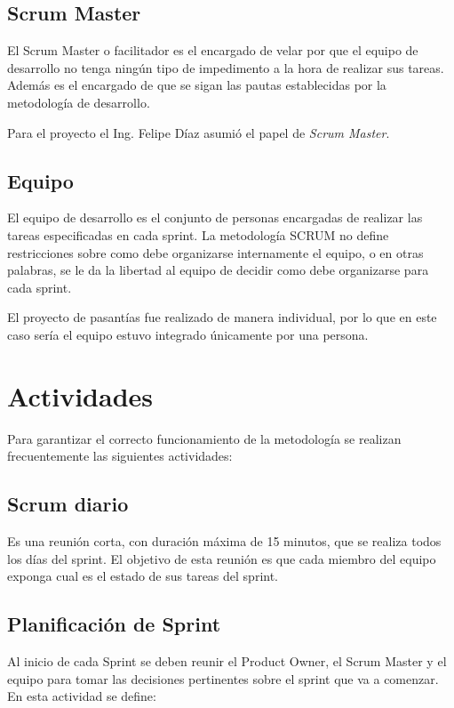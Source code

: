 \subsection{Scrum Master}
El Scrum Master o facilitador es el encargado de velar por que el equipo de
desarrollo no tenga ningún tipo de impedimento a la hora de realizar sus tareas.
Además es el encargado de que se sigan las pautas establecidas por la metodología
de desarrollo.

Para el proyecto el Ing. Felipe Díaz asumió el papel de \emph{Scrum Master}.

\subsection{Equipo}

El equipo de desarrollo es el conjunto de personas encargadas de realizar las tareas
especificadas en cada sprint. La metodología SCRUM no define restricciones sobre como
debe organizarse internamente el equipo, o en otras palabras, se le da la libertad al
equipo de decidir como debe organizarse para cada sprint.

El proyecto de pasantías fue realizado de manera individual, por lo que
en este caso sería el equipo estuvo integrado únicamente por una persona.

\section{Actividades}

Para garantizar el correcto funcionamiento de la metodología se realizan frecuentemente
las siguientes actividades:

\subsection{Scrum diario}
Es una reunión corta, con duración máxima de 15 minutos, que se realiza todos los días
del sprint. El objetivo de esta reunión es que cada miembro del equipo exponga cual
es el estado de sus tareas del sprint.

\subsection{Planificación de Sprint}
Al inicio de cada Sprint se deben reunir el Product Owner, el Scrum Master y el equipo
para tomar las decisiones pertinentes sobre el sprint que va a comenzar. En esta actividad
se define:

